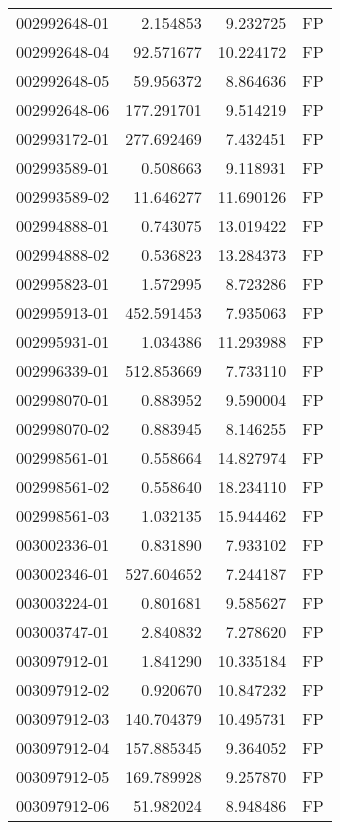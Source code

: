 \begin{tabular}{lrrl}
002992648-01 &    2.154853 &       9.232725 &   FP \\
002992648-04 &   92.571677 &      10.224172 &   FP \\
002992648-05 &   59.956372 &       8.864636 &   FP \\
002992648-06 &  177.291701 &       9.514219 &   FP \\
002993172-01 &  277.692469 &       7.432451 &   FP \\
002993589-01 &    0.508663 &       9.118931 &   FP \\
002993589-02 &   11.646277 &      11.690126 &   FP \\
002994888-01 &    0.743075 &      13.019422 &   FP \\
002994888-02 &    0.536823 &      13.284373 &   FP \\
002995823-01 &    1.572995 &       8.723286 &   FP \\
002995913-01 &  452.591453 &       7.935063 &   FP \\
002995931-01 &    1.034386 &      11.293988 &   FP \\
002996339-01 &  512.853669 &       7.733110 &   FP \\
002998070-01 &    0.883952 &       9.590004 &   FP \\
002998070-02 &    0.883945 &       8.146255 &   FP \\
002998561-01 &    0.558664 &      14.827974 &   FP \\
002998561-02 &    0.558640 &      18.234110 &   FP \\
002998561-03 &    1.032135 &      15.944462 &   FP \\
003002336-01 &    0.831890 &       7.933102 &   FP \\
003002346-01 &  527.604652 &       7.244187 &   FP \\
003003224-01 &    0.801681 &       9.585627 &   FP \\
003003747-01 &    2.840832 &       7.278620 &   FP \\
003097912-01 &    1.841290 &      10.335184 &   FP \\
003097912-02 &    0.920670 &      10.847232 &   FP \\
003097912-03 &  140.704379 &      10.495731 &   FP \\
003097912-04 &  157.885345 &       9.364052 &   FP \\
003097912-05 &  169.789928 &       9.257870 &   FP \\
003097912-06 &   51.982024 &       8.948486 &   FP \\

\end{tabular}
